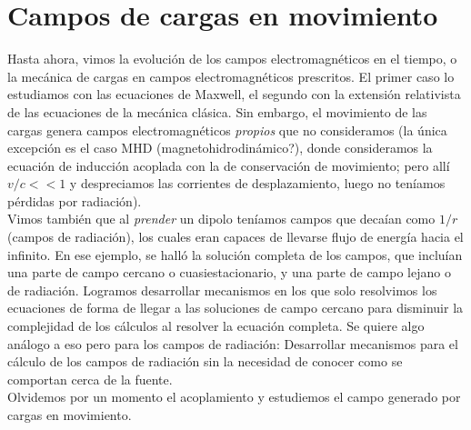 
\newpage
\section{Campos de cargas en movimiento}
Hasta ahora, vimos la evolución de los campos electromagnéticos en el tiempo, o la mecánica de cargas en campos electromagnéticos prescritos. El primer caso lo estudiamos con las ecuaciones de Maxwell, el segundo con la extensión relativista de las ecuaciones de la mecánica clásica. Sin embargo, el movimiento de las cargas genera campos electromagnéticos \textit{propios} que no consideramos (la única excepción es el caso MHD (magnetohidrodinámico?), donde consideramos la ecuación de inducción acoplada con la de conservación de movimiento; pero allí $v/c << 1$ y despreciamos las corrientes de desplazamiento, luego no teníamos pérdidas por radiación).\\
\indent Vimos también que al \textit{prender} un dipolo teníamos campos que decaían como $1/r$ (campos de radiación), los cuales eran capaces de llevarse flujo de energía hacia el infinito. En ese ejemplo, se halló la solución completa de los campos, que incluían una parte de campo cercano o cuasiestacionario, y una parte de campo lejano o de radiación. Logramos desarrollar mecanismos en los que solo resolvimos los ecuaciones de forma de llegar a las soluciones de campo cercano para disminuir la complejidad de los cálculos al resolver la ecuación completa. Se quiere algo análogo a eso pero para los campos de radiación: Desarrollar mecanismos para el cálculo de los campos de radiación sin la necesidad de conocer como se comportan cerca de la fuente.\\
\indent Olvidemos por un momento el acoplamiento y estudiemos el campo generado por cargas en movimiento.


